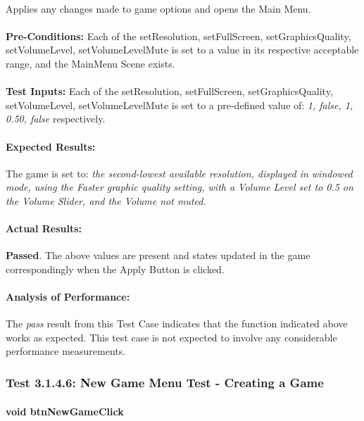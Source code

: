 \documentclass{article}
\begin{document}
    \paragraph{} Applies any changes made to game options and opens the Main Menu.
    \paragraph{}\textbf{Pre-Conditions:} Each of the setResolution, setFullScreen, setGraphicsQuality, setVolumeLevel, setVolumeLevelMute is set to a value in its respective acceptable range, and the MainMenu Scene exists.
    \paragraph{}\textbf{Test Inputs:} Each of the  setResolution, setFullScreen, setGraphicsQuality, setVolumeLevel, setVolumeLevelMute is set to a pre-defined value of:  \emph{1, false, 1, 0.50, false} respectively.
    \paragraph{Expected Results:} The game is set to: \emph{the second-lowest available resolution, displayed in windowed mode, using the Faster graphic quality setting, with a Volume Level set to 0.5 on the Volume Slider, and the Volume not muted.}
    \paragraph{Actual Results:} \textbf{Passed}. The above values are present and states updated in the game correspondingly when the Apply Button is clicked.
    \paragraph{Analysis of Performance:} The \emph{pass} result from this Test Case indicates that the function indicated above works as expected. This test case is not expected to involve any considerable performance measurements.
    
     \subsubsection{Test 3.1.4.6: New Game Menu Test - Creating a Game }
    \paragraph{}\textbf{void btnNewGameClick}
\end{document}
